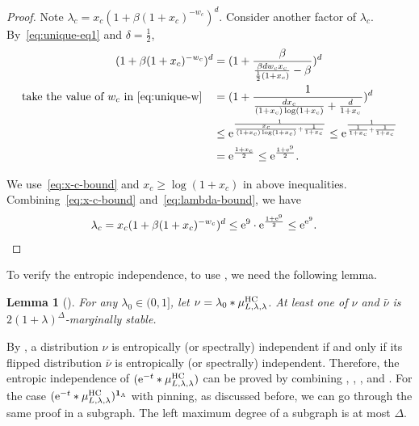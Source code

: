 \documentclass[11pt,a4paper]{article}
\newcommand{\e}{\mathrm{e}}
\newtheorem{lemma}[theorem]{Lemma}
\theoremstyle{definition}
\def\*#1{\mathbf{#1}} %
\begin{document}
\begin{proof}
Note $\lambda_c = x_c(1+\beta(1+x_c)^{-w_c})^d$.
Consider another factor of $\lambda_c$. By~\eqref{eq:unique-eq1} and $\delta=\frac{1}{2}$,
\begin{align}\label{eq:lambda-bound}
\begin{split}
    (1+\beta(1+x_c)^{-w_c})^d&=(1+\frac{\beta}{\frac{\beta dw_c x_c}{\frac{1}{2}(1+x_c)}-\beta})^d\\
    \textnormal{take the value of }w_c \text{ in \eqref{eq:unique-w}}\quad&= (1+\frac{1}{\frac{dx_c}{(1+x_c)\log (1+x_c)}+\frac{d}{1+x_c}})^d\\
    &\leq \e^{\frac{1}{\frac{x_c}{(1+x_c)\log (1+x_c)}+\frac{1}{1+x_c}}}\leq \e^{\frac{1}{\frac{1}{1+x_c}+\frac{1}{1+x_c}}}\\
    &=\e^{\frac{1+x_c}{2}}\leq \e^{\frac{1+\e^9}{2}}.
\end{split}
\end{align}

We use~\eqref{eq:x-c-bound} and $x_c\geq\log(1+x_c)$ in above inequalities. 
Combining~\eqref{eq:x-c-bound} and~\eqref{eq:lambda-bound}, we have 
\begin{align*}
    \lambda_c = x_c(1+\beta(1+x_c)^{-w_c})^d\leq \e^9\cdot \e^{\frac{1+\e^9}{2}} \leq \e^{\e^9}. &\qedhere
\end{align*}
\end{proof}

To verify the entropic independence, to use , we need the following lemma.

\begin{lemma}[]\label{lem:bhc-marginal-bound}
For any $\lambda_0\in (0,1]$, let $\nu = \lambda_0 * \mu_{L,\lambda,\lambda}^{\textnormal{HC}}$. At least one of $\nu$ and $\bar{\nu}$ is $2(1+\lambda)^\Delta$-marginally stable.   
\end{lemma}

By , a distribution $\nu$ is entropically (or spectrally) independent if and only if its flipped distribution $\bar{\nu}$ is entropically (or spectrally) independent. Therefore, the entropic independence of $(\e^{-t} * \mu_{L,\lambda,\lambda}^{\textnormal{HC}})$ can be proved by combining , , , and .
For the case $(\e^{-t} * \mu_{L,\lambda,\lambda}^{\textnormal{HC}})^{\*1_\Lambda}$ with pinning, as discussed before, we can go through the same proof in a subgraph. The left maximum degree of a subgraph is at most $\Delta$.
\end{document}

